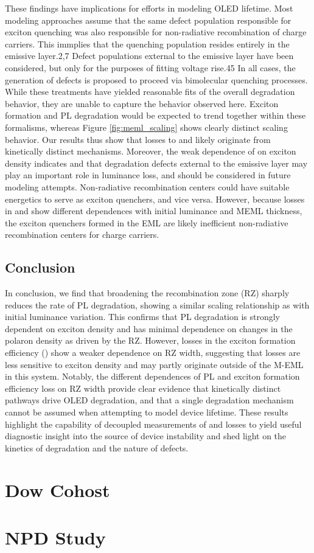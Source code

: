 \documentclass[../thesis.tex]{subfiles}
\begin{document}
These findings have implications for efforts in modeling OLED lifetime. 
Most modeling approaches assume that the same defect population responsible for exciton quenching was also responsible for non-radiative recombination of charge carriers. 
This immplies that the quenching population resides entirely in the emissive layer.2,7 \supercite{Giebink2008a,Zhang2014}
Defect populations external to the emissive layer have been considered, but only for the purposes of fitting voltage rise.45 \supercite{Lee2017}
In all cases, the generation of defects is proposed to proceed via bimolecular quenching processes.
While these treatments have yielded reasonable fits of the overall degradation behavior, they are unable to capture the behavior observed here.
Exciton formation and PL degradation would be expected to trend together within these formalisms, whereas Figure \ref{fig:meml_scaling} shows clearly distinct scaling behavior. 
Our results thus show that losses to \pl and \ef likely originate from kinetically distinct mechanisms.  
Moreover, the weak dependence of \ef on exciton density indicates and that degradation defects external to the emissive layer may play an important role in luminance loss, and should be considered in future modeling attempts.
Non-radiative recombination centers could have suitable energetics to serve as exciton quenchers, and vice versa.
However, because losses in \ef and \pl show different dependences with initial luminance and MEML thickness, the exciton quenchers formed in the EML are likely inefficient non-radiative recombination centers for charge carriers.

\subsection{Conclusion}

In conclusion, we find that broadening the recombination zone (RZ) sharply reduces the rate of PL degradation, showing a similar scaling relationship as with initial luminance variation. 
This confirms that PL degradation is strongly dependent on exciton density and has minimal dependence on changes in the polaron density as driven by the RZ.  
However, losses in the exciton formation efficiency (\ef) show a weaker dependence on RZ width, suggesting that \ef losses are less sensitive to exciton density and may partly originate outside of the M-EML in this system. 
Notably, the different dependences of PL and exciton formation efficiency loss on RZ width provide clear evidence that kinetically distinct pathways drive OLED degradation, and that a single degradation mechanism cannot be assumed when attempting to model device lifetime. 
These results highlight the capability of decoupled measurements of \pl and \ef losses to yield useful diagnostic insight into the source of device instability and shed light on the kinetics of degradation and the nature of defects.


\section{Dow Cohost}\label{sec:lifetime_dow}

\section{NPD Study}


\end{document}
